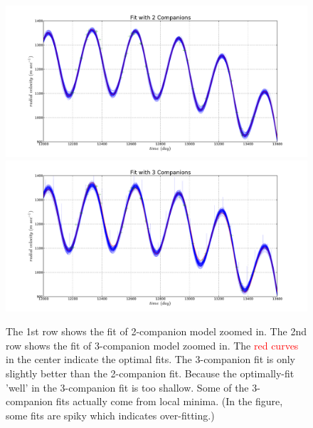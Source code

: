 \documentclass[letterpaper, preprint]{aastex}
\begin{document}
\begin{figure}
 \centering
 \includegraphics[width=0.99\linewidth]{fit_122_comp_2_small.pdf}\\
 \includegraphics[width=0.99\linewidth]{fit_122_comp_3_small.pdf}
\caption{The 1st row shows the fit of 2-companion model zoomed in.  The 2nd row shows the fit of 3-companion model zoomed in. The \textcolor{red}{red curves} in the center indicate the optimal fits. The 3-companion fit is only slightly better than the 2-companion fit. Because the optimally-fit 'well' in the 3-companion fit is too shallow. Some of the 3-companion fits actually come from local minima. (In the figure, some fits are spiky which indicates over-fitting.)}
 \label{fig:fit-122-2-3-zoom}
\end{figure}
\end{document}
